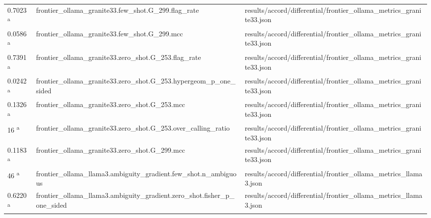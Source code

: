 \begin{longtable}{@{}p{0.7in}p{1.9in}p{2.6in}@{}}
0.7023 \textsuperscript{a} & frontier\_ollama\_granite33.\allowbreak{}few\_shot.\allowbreak{}G\_299.\allowbreak{}flag\_rate & results/\allowbreak{}accord/\allowbreak{}differential/\allowbreak{}frontier\_ollama\_metrics\_granite33.\allowbreak{}json\\
0.0586 \textsuperscript{a} & frontier\_ollama\_granite33.\allowbreak{}few\_shot.\allowbreak{}G\_299.\allowbreak{}mcc & results/\allowbreak{}accord/\allowbreak{}differential/\allowbreak{}frontier\_ollama\_metrics\_granite33.\allowbreak{}json\\
0.7391 \textsuperscript{a} & frontier\_ollama\_granite33.\allowbreak{}zero\_shot.\allowbreak{}G\_253.\allowbreak{}flag\_rate & results/\allowbreak{}accord/\allowbreak{}differential/\allowbreak{}frontier\_ollama\_metrics\_granite33.\allowbreak{}json\\
0.0242 \textsuperscript{a} & frontier\_ollama\_granite33.\allowbreak{}zero\_shot.\allowbreak{}G\_253.\allowbreak{}hypergeom\_p\_one\_sided & results/\allowbreak{}accord/\allowbreak{}differential/\allowbreak{}frontier\_ollama\_metrics\_granite33.\allowbreak{}json\\
0.1326 \textsuperscript{a} & frontier\_ollama\_granite33.\allowbreak{}zero\_shot.\allowbreak{}G\_253.\allowbreak{}mcc & results/\allowbreak{}accord/\allowbreak{}differential/\allowbreak{}frontier\_ollama\_metrics\_granite33.\allowbreak{}json\\
16 \textsuperscript{a} & frontier\_ollama\_granite33.\allowbreak{}zero\_shot.\allowbreak{}G\_253.\allowbreak{}over\_calling\_ratio & results/\allowbreak{}accord/\allowbreak{}differential/\allowbreak{}frontier\_ollama\_metrics\_granite33.\allowbreak{}json\\
0.1183 \textsuperscript{a} & frontier\_ollama\_granite33.\allowbreak{}zero\_shot.\allowbreak{}G\_299.\allowbreak{}mcc & results/\allowbreak{}accord/\allowbreak{}differential/\allowbreak{}frontier\_ollama\_metrics\_granite33.\allowbreak{}json\\
46 \textsuperscript{a} & frontier\_ollama\_llama3.\allowbreak{}ambiguity\_gradient.\allowbreak{}few\_shot.\allowbreak{}n\_ambiguous & results/\allowbreak{}accord/\allowbreak{}differential/\allowbreak{}frontier\_ollama\_metrics\_llama3.\allowbreak{}json\\
0.6220 \textsuperscript{a} & frontier\_ollama\_llama3.\allowbreak{}ambiguity\_gradient.\allowbreak{}zero\_shot.\allowbreak{}fisher\_p\_one\_sided & results/\allowbreak{}accord/\allowbreak{}differential/\allowbreak{}frontier\_ollama\_metrics\_llama3.\allowbreak{}json\\

\end{longtable}
